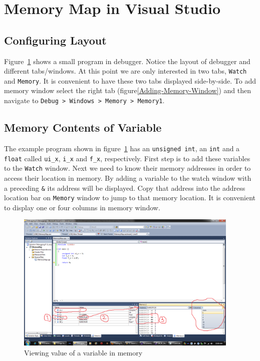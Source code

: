 \documentclass[12pt,a4paper]{article}
\begin{document}
\section{Memory Map in Visual Studio}
\subsection{Configuring Layout}
Figure~\ref{Debugger-Layout} shows a small program in debugger. Notice the layout of debugger and different tabs/windows. At this point we are only interested in two tabs, \verb|Watch| and \verb|Memory|. It is convenient to have these two tabs displayed side-by-side. To add memory window select the right tab (figure\ref{Adding-Memory-Window}) and then navigate to \verb|Debug > Windows > Memory > Memory1|.

\subsection{Memory Contents of Variable}
The example program shown in figure~\ref{Debugger-Layout} has an \verb|unsigned int|, an \verb|int| and a \verb|float| called \verb|ui_x|, \verb|i_x| and \verb|f_x|, respectively. First step is to add these variables to the \verb|Watch| window. Next we need to know their memory addresses in order to access their location in memory. By adding a variable to the watch window with a preceding \verb|&| its address will be displayed. Copy that address into the address location bar on \verb|Memory| window to jump to that memory location. It is convenient to display one or four columns in memory window.

\begin{figure}[H]
\centering
\label{Debugger-Layout}
\includegraphics[width=0.95\textwidth]{DebuggerLayout.png}
\caption{Viewing value of a variable in memory}
\end{figure}
\end{document}
